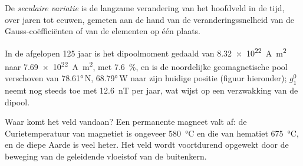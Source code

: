 \begin{definition}\label{def:b3:palaeomagnetism:secular}
De \emph{seculaire variatie} is de langzame verandering van het
hoofdveld in de tijd, over jaren tot eeuwen, gemeten aan de hand van de
veranderingssnelheid van de Gauss-coëfficiënten of van de elementen op één plaats.
\end{definition}

In de afgelopen 125 jaar is het dipoolmoment gedaald van
\qty{8.32e22}{A.m^2} naar \qty{7.69e22}{A.m^2}, met \qty{7.6}{\percent}, en is de
noordelijke geomagnetische pool verschoven van \ang{78.61}\,N, \ang{68.79}\,W naar zijn
huidige positie (figuur hieronder); $g_1^0$ neemt nog steeds toe met \qty{12.6}{nT} per jaar,
wat wijst op een verzwakking van de dipool.

\begin{omfigure}

\par{}\label{fig:b3:palaeomagnetism:dipole}
\end{omfigure}

Waar komt het veld vandaan? Een permanente magneet valt af: de Curietemperatuur van
magnetiet is ongeveer \qty{580}{\celsius} en die van hematiet
\qty{675}{\celsius}, en de diepe Aarde is veel heter. Het veld wordt
voortdurend opgewekt door de beweging van de geleidende vloeistof van de
buitenkern.

